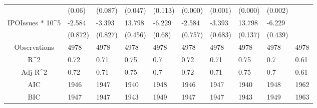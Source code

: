 \documentclass{article}
\begin{document}
\begin{table}[H]
\begin{tabular}{|clllllllll|}
   & (0.06) & (0.087) & (0.047) & (0.113) & (0.000) & (0.001) & (0.000) & (0.002) &  \\ 
  IPOIssues * 10^5 & -2.584 & -3.393 & 13.798 & -6.229 & -2.584 & -3.393 & 13.798 & -6.229 &  \\ 
   & (0.872) & (0.827) & (0.456) & (0.68) & (0.757) & (0.683) & (0.137) & (0.439) &  \\ 
  \hline 
 Observations & 4978 & 4978 & 4978 & 4978 & 4978 & 4978 & 4978 & 4978 & 4978 \\ 
  R^2 & 0.72 & 0.71 & 0.75 & 0.7 & 0.72 & 0.71 & 0.75 & 0.7 & 0.61 \\ 
  Adj R^2 & 0.72 & 0.71 & 0.75 & 0.7 & 0.72 & 0.71 & 0.75 & 0.7 & 0.61 \\ 
  AIC & 1946 & 1947 & 1940 & 1948 & 1946 & 1947 & 1940 & 1948 & 1962 \\ 
  BIC & 1947 & 1947 & 1943 & 1949 & 1947 & 1947 & 1943 & 1949 & 1963 \\ 
   \hline
\end{tabular}
 
\end{table}
\end{document}
